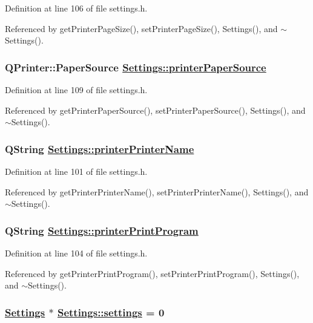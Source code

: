 Definition at line 106 of file settings.h.

Referenced by get\-Printer\-Page\-Size(), set\-Printer\-Page\-Size(), Settings(), and $\sim$Settings().\hypertarget{classSettings_r17}{
\subsubsection[printerPaperSource]{\setlength{\rightskip}{0pt plus 5cm}QPrinter::Paper\-Source \hyperlink{classSettings_r17}{Settings::printer\-Paper\-Source}}}
\label{classSettings_r17}


Definition at line 109 of file settings.h.

Referenced by get\-Printer\-Paper\-Source(), set\-Printer\-Paper\-Source(), Settings(), and $\sim$Settings().\hypertarget{classSettings_r9}{
\subsubsection[printerPrinterName]{\setlength{\rightskip}{0pt plus 5cm}QString \hyperlink{classSettings_r9}{Settings::printer\-Printer\-Name}}}
\label{classSettings_r9}


Definition at line 101 of file settings.h.

Referenced by get\-Printer\-Printer\-Name(), set\-Printer\-Printer\-Name(), Settings(), and $\sim$Settings().\hypertarget{classSettings_r12}{
\subsubsection[printerPrintProgram]{\setlength{\rightskip}{0pt plus 5cm}QString \hyperlink{classSettings_r12}{Settings::printer\-Print\-Program}}}
\label{classSettings_r12}


Definition at line 104 of file settings.h.

Referenced by get\-Printer\-Print\-Program(), set\-Printer\-Print\-Program(), Settings(), and $\sim$Settings().\hypertarget{classSettings_v0}{
\subsubsection[settings]{\setlength{\rightskip}{0pt plus 5cm}\hyperlink{classSettings}{Settings} $\ast$ \hyperlink{classSettings_v0}{Settings::settings} = 0}}
\label{classSettings_v0}


